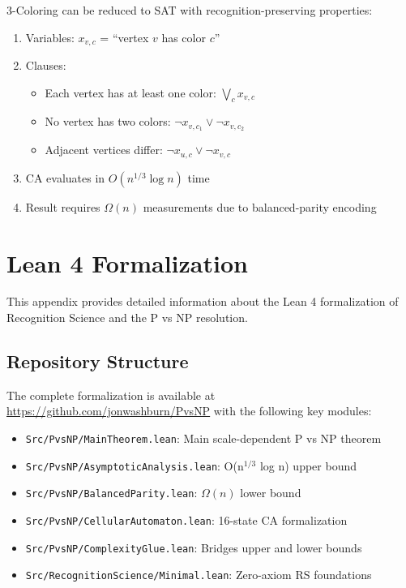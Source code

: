 \documentclass[11pt]{article}
\theoremstyle{plain}
\theoremstyle{definition}
\theoremstyle{remark}
\begin{document}
3-Coloring can be reduced to SAT with recognition-preserving properties:

\begin{enumerate}
\item Variables: $x_{v,c}$ = ``vertex $v$ has color $c$''
\item Clauses: 
   \begin{itemize}
   \item Each vertex has at least one color: $\bigvee_c x_{v,c}$
   \item No vertex has two colors: $\neg x_{v,c_1} \lor \neg x_{v,c_2}$
   \item Adjacent vertices differ: $\neg x_{u,c} \lor \neg x_{v,c}$
   \end{itemize}
\item CA evaluates in $O(n^{1/3} \log n)$ time
\item Result requires $\Omega(n)$ measurements due to balanced-parity encoding
\end{enumerate}

\section{Lean 4 Formalization}
\label{app:lean}

This appendix provides detailed information about the Lean 4 formalization of Recognition Science and the P vs NP resolution.

\subsection{Repository Structure}

The complete formalization is available at \url{https://github.com/jonwashburn/PvsNP} with the following key modules:

\begin{itemize}
\item \texttt{Src/PvsNP/MainTheorem.lean}: Main scale-dependent P vs NP theorem
\item \texttt{Src/PvsNP/AsymptoticAnalysis.lean}: O(n$^{1/3}$ log n) upper bound
\item \texttt{Src/PvsNP/BalancedParity.lean}: $\Omega(n)$ lower bound  
\item \texttt{Src/PvsNP/CellularAutomaton.lean}: 16-state CA formalization
\item \texttt{Src/PvsNP/ComplexityGlue.lean}: Bridges upper and lower bounds
\item \texttt{Src/RecognitionScience/Minimal.lean}: Zero-axiom RS foundations
\end{itemize}
\end{document}
